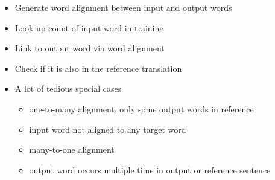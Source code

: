 \documentclass[landscape]{jhuslides3C}
\begin{document}
\vfill
\begin{itemize}
\item Generate word alignment between input and output words
\item Look up count of input word in training
\item Link to output word via word alignment
\item Check if it is also in the reference translation\pause
\item A lot of tedious special cases
\begin{itemize}
\item one-to-many alignment, only some output words in reference
\item input word not aligned to any target word
\item many-to-one alignment
\item output word occurs multiple time in output or reference sentence
\end{itemize}
\end{itemize}
\vfill

\end{document}
